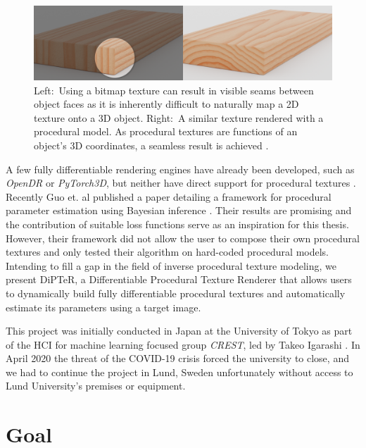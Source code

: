 \begin{figure}
    \centering
    \includegraphics[width=\textwidth]{img/background/PlaneOrNotAPlane.png}
    \caption{Left$:$ Using a bitmap texture can result in visible seams between object faces as it is inherently difficult to naturally map a 2D texture onto a 3D object. Right$:$ A similar texture rendered with a procedural model. As procedural textures are functions of an object's 3D coordinates, a seamless result is achieved \cite{_comparison}.}
    \label{fig:BitmapVsProcedural}
\end{figure}

A few fully differentiable rendering engines have already been developed, such as \textit{OpenDR} or \textit{PyTorch3D}, but neither have direct support for procedural textures \cite{loper_2014_opendr, facebookresearch_2020_facebookresearchpytorch3d}. Recently Guo et. al published a paper detailing a framework for procedural parameter estimation using Bayesian inference \cite{guo_2019_a}. Their results are promising and the contribution of suitable loss functions serve as an inspiration for this thesis. However, their framework did not allow the user to compose their own procedural textures and only tested their algorithm on hard-coded procedural models. Intending to fill a gap in the field of inverse procedural texture modeling, we present DiPTeR, a Differentiable Procedural Texture Renderer that allows users to dynamically build fully differentiable procedural textures and automatically estimate its parameters using a target image. 

This project was initially conducted in Japan at the University of Tokyo as part of the HCI for machine learning focused group \textit{CREST}, led by Takeo Igarashi \cite{jstcrest_2020_jst}. In April 2020 the threat of the COVID-19 crisis forced the university to close, and we had to continue the project in Lund, Sweden unfortunately without access to Lund University's premises or equipment.

\section{Goal}


